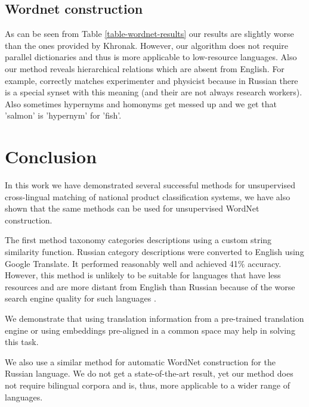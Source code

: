 \documentclass[11pt,a4paper]{article}
\begin{document}
\subsection{Wordnet construction}



As can be seen from Table \ref{table-wordnet-results} our results are slightly worse than the ones provided by Khronak. However, our algorithm does not require parallel dictionaries and thus is more applicable to low-resource languages.
Also our method reveals hierarchical relations which are absent from English. For example, correctly matches experimenter and physicist because in Russian there is a special synset with this meaning (and their are not always research workers). Also sometimes hypernyms and homonyms get messed up and we get that 'salmon' is 'hypernym' for 'fish'.

%
%


\section{Conclusion}
In this work we have demonstrated several successful methods for unsupervised cross-lingual matching of national product classification systems, we have also shown that the same methods can be used for unsupervised WordNet construction.

The first method taxonomy categories descriptions using a custom string similarity function. Russian category descriptions were converted to English using Google Translate. It performed reasonably well and achieved 41\% accuracy. However, this method is unlikely to be suitable for languages that have less resources and are more distant from English than Russian because of the worse search engine quality for such languages \cite{google-translate-rare}.


We demonstrate that using translation information from a pre-trained translation engine or using embeddings pre-aligned in a common space may help in solving this task. 

We also use a similar method for automatic WordNet construction for the Russian language. We do not get a state-of-the-art result, yet our method does not require bilingual corpora and is, thus, more applicable to a wider range of languages.




\end{document}
